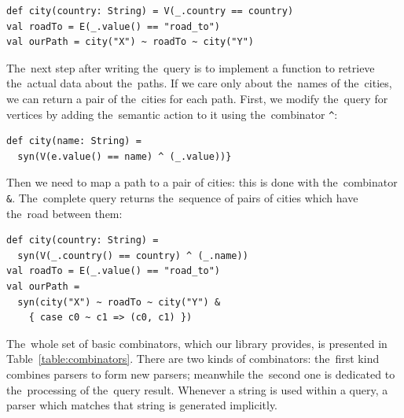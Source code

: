 \begin{lstlisting}
def city(country: String) = V(_.country == country)
val roadTo = E(_.value() == "road_to")
val ourPath = city("X") ~ roadTo ~ city("Y")
\end{lstlisting}

The~next step after writing the~query is to implement a function to retrieve the~actual data about the~paths.
If we care only about the~names of the~cities, we can return a pair of the~cities for each path.
First, we modify the~query for vertices by adding the~semantic action to it using the~combinator \lstinline{^}:

\begin{lstlisting}
def city(name: String) =
  syn(V(e.value() == name) ^ (_.value))}
\end{lstlisting}

Then we need to map a path to a pair of cities: this is done with the~combinator \lstinline{&}.
The~complete query returns the~sequence of pairs of cities which have the~road between them:

\begin{lstlisting}
def city(country: String) =
  syn(V(_.country() == country) ^ (_.name))
val roadTo = E(_.value() == "road_to")
val ourPath =
  syn(city("X") ~ roadTo ~ city("Y") &
    { case c0 ~ c1 => (c0, c1) })
\end{lstlisting}

The~whole set of basic combinators, which our library provides, is presented in Table~\ref{table:combinators}.
There are two kinds of combinators: the~first kind combines parsers to form new parsers; meanwhile the~second one is dedicated to the~processing of the~query result.
Whenever a string is used within a query, a parser which matches that string is generated implicitly.

